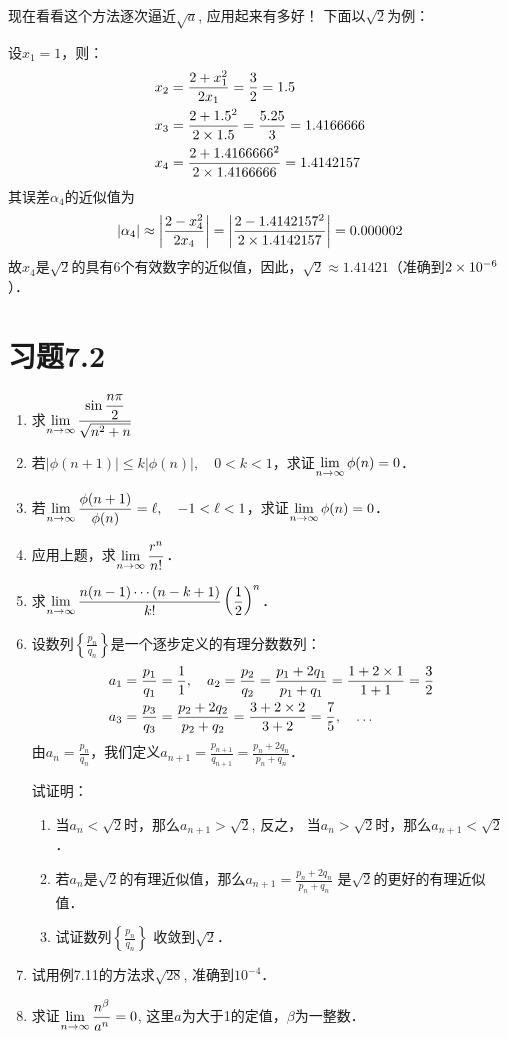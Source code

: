 现在看看这个方法逐次逼近$\sqrt{a}$, 应用起来有多好！
下面以$\sqrt{2}$为例：

设$x_1=1$，则：
\[\begin{split}
    x_2&=\dfrac{2+x^2_1}{2x_1}=\dfrac{3}{2}=1.5\\
    x_3&=\dfrac{2+1.5^2}{2\times 1.5}=\dfrac{5.25}{3}=1.4166666   \\
    x_4&=\dfrac{2+1.4166666^2}{2\times 1.4166666}=1.4142157   \\
\end{split}\]
其误差$\alpha_4$的近似值为
\[|\alpha_4|\approx \left|\dfrac{2-x^2_4}{2x_4}\right|=\left|\dfrac{2-1.4142157^2}{2\times 1.4142157}\right|=0.000002\]
故$x_4$是$\sqrt{2}$的具有6个有效数字的近似值，因此，$\sqrt{2}\approx 1.41421$（准确到$2\times10^{-6}$）．

\section*{习题7.2}

\begin{enumerate}
    \item 求$\displaystyle\lim_{n\to\infty}\dfrac{\sin\dfrac{n\pi}{2}}{\sqrt{n^2+n}} $
\item 若$|\phi(n+1)|\le k|\phi(n)|,\quad 0<k<1$，求证$\displaystyle\lim_{n\to\infty}\phi(n)=0$．
\item 若$\displaystyle\lim_{n\to\infty}\dfrac{\phi(n+1)}{\phi(n)}=\ell,\quad -1<\ell<1$，求证$\displaystyle\lim_{n\to\infty}\phi(n)=0$．
\item 应用上题，求$\displaystyle\lim_{n\to\infty}\dfrac{r^n}{n!}$．
\item 求$\displaystyle\lim_{n\to\infty}\dfrac{n(n-1)\cdots (n-k+1)}{k!}\left(\dfrac{1}{2}\right)^n$．
\item 设数列$\left\{\frac{p_n}{q_n}\right\}$是一个逐步定义的有理分数数列：
\[\begin{split}
    a_1&=\dfrac{p_1}{q_1}=\dfrac{1}{1},\quad a_2=\dfrac{p_2}{q_2}=\dfrac{p_1+2q_1}{p_1+q_1}=\dfrac{1+2\times 1}{1+1}=\dfrac{3}{2}\\
a_3&=\dfrac{p_3}{q_3}=\dfrac{p_2+2q_2}{p_2+q_2}=\dfrac{3+2\times2}{3+2}=\dfrac{7}{5},\quad \ldots
\end{split}\]
由$a_n=\frac{p_n}{q_n}$，我们定义$a_{n+1}=\frac{p_{n+1}}{q_{n+1}}=\frac{p_n+2q_n}{p_n+q_n}$．

试证明： \begin{enumerate}
    \item 当$a_n<\sqrt{2}$时，那么$a_{n+1}>\sqrt{2}$, 反之，
    当$a_n>\sqrt{2}$时，那么$a_{n+1}<\sqrt{2}$．
    \item 若$a_n$是$\sqrt{2}$的有理近似值，那么$a_{n+1}=\frac{p_n+2q_n}{p_n+q_n}$
    是$\sqrt{2}$的更好的有理近似值．
    \item 试证数列$\left\{\frac{p_n}{q_n}\right\}$
   收敛到$\sqrt{2}$．
\end{enumerate}
\item 试用例7.11的方法求$\sqrt{28}$, 准确到$10^{-4}$．
\item 求证$\displaystyle\lim_{n\to\infty}\dfrac{n^{\beta}}{a^n}=0$, 这里$a$为大于1的定值，$\beta$为一整数．
\end{enumerate}

